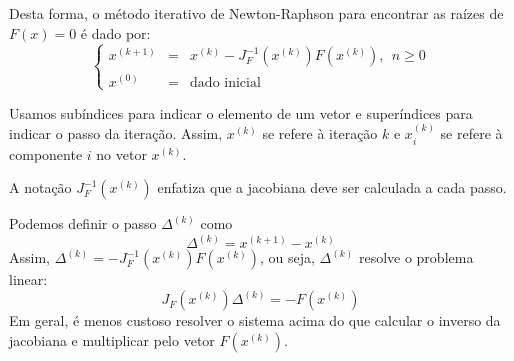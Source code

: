 Desta forma, o método iterativo de Newton-Raphson para encontrar as raízes de $F(x)=0$ é dado por:
\begin{equation*}
\left\{\begin{array}{rcl}
x^{(k+1)} &=& x^{(k)}-J_F^{-1}\left(x^{(k)}\right)F(x^{(k)}),~~ n\geq 0\\
x^{(0)}&=&\text{dado inicial}
\end{array}\right.
\end{equation*}

\begin{obs} Usamos subíndices para indicar o elemento de um vetor e superíndices para indicar o passo da iteração. Assim, $x^{(k)}$ se refere à iteração $k$ e $x_i^{(k)}$ se refere à componente $i$ no vetor $x^{(k)}$.
\end{obs}
\begin{obs} A notação $J_F^{-1}\left(x^{(k)}\right)$ enfatiza que a jacobiana deve ser calculada a cada passo.
\end{obs}
\begin{obs} Podemos definir o passo $\Delta^{(k)}$ como
$$\Delta^{(k)}= x^{(k+1)}-x^{(k)}$$
Assim, $\Delta^{(k)}=-J_F^{-1}\left(x^{(k)}\right)F(x^{(k)})$, ou seja, $\Delta^{(k)}$ resolve o problema linear:
$$J_F\left(x^{(k)}\right)\Delta^{(k)}= - F(x^{(k)})$$
Em geral, é menos custoso resolver o sistema acima do que calcular o inverso da jacobiana e multiplicar pelo vetor $F(x^{(k)})$.
\end{obs}


